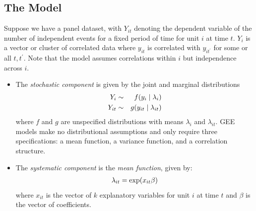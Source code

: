 \documentclass[letterpaper,10pt,english]{sphinxmanual}
\begin{document}
\subsection{The Model}
\label{vignette:id136}
Suppose we have a panel dataset, with \(Y_{it}\) denoting the
dependent variable of the number of independent events for a fixed
period of time for unit \(i\) at time \(t\). \(Y_{i}\) is a
vector or cluster of correlated data where \(y_{it}\) is correlated
with \(y_{it^\prime}\) for some or all \(t, t^\prime\). Note
that the model assumes correlations within \(i\) but independence
across \(i\).
\begin{itemize}
\item {} 
The \emph{stochastic component} is given by the joint and marginal
distributions
\begin{gather}
\begin{split}\begin{aligned}
Y_{i} &\sim& f(y_{i} \mid \lambda_{i})\\
Y_{it} &\sim& g(y_{it} \mid \lambda_{it})\end{aligned}\end{split}\notag
\end{gather}
where \(f\) and \(g\) are unspecified distributions with
means \(\lambda_{i}\) and \(\lambda_{it}\). GEE models make
no distributional assumptions and only require three specifications:
a mean function, a variance function, and a correlation structure.

\item {} 
The \emph{systematic component} is the \emph{mean function}, given by:
\begin{gather}
\begin{split}\lambda_{it}  = \mathrm{exp}(x_{it} \beta)\end{split}\notag
\end{gather}
where \(x_{it}\) is the vector of \(k\) explanatory variables
for unit \(i\) at time \(t\) and \(\beta\) is the vector
of coefficients.


\end{itemize}
\end{document}
